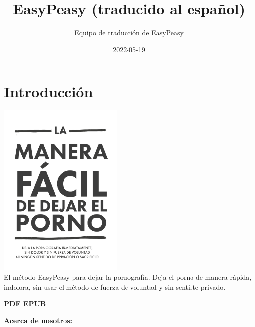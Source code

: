 \documentclass[
  openany]{book}
\title{EasyPeasy (traducido al español)}
\author{Equipo de traducción de EasyPeasy}
\date{2022-05-19}
\let\oldhref\href
\renewcommand{\href}[2]{\textcolor{blue}{\oldhref{#1}{#2}}}
\begin{document}
\maketitle

{
\setcounter{tocdepth}{1}
\tableofcontents
}
\hypertarget{introducciuxf3n}{%
\chapter{Introducción}\label{introducciuxf3n}}

\includegraphics[width=0.45\textwidth,height=0.45\textheight]{img-cover.png}\\

El método EasyPeasy para dejar la pornografía. Deja el porno de manera rápida, indolora, sin usar el método de fuerza de voluntad y sin sentirte privado.

{\textbf{\href{easypeasyespanol.pdf}{PDF} \textbar{} \href{easypeasyespanol.epub}{EPUB}}}

\textbf{Acerca de nosotros:}
\end{document}
